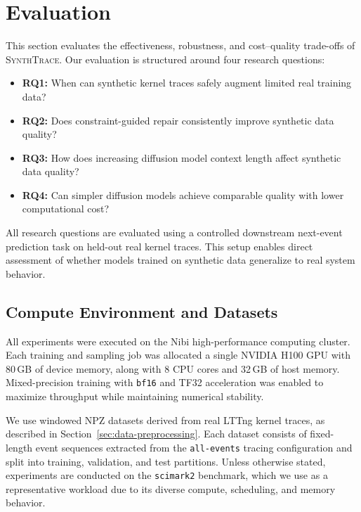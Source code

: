 \section{Evaluation}
\label{sec:evaluation}

This section evaluates the effectiveness, robustness, and cost–quality trade-offs of \textsc{SynthTrace}. Our evaluation is structured around four research questions:

\begin{itemize}[leftmargin=*]
  \item \textbf{RQ1:} When can synthetic kernel traces safely augment limited real training data?
  \item \textbf{RQ2:} Does constraint-guided repair consistently improve synthetic data quality?
  \item \textbf{RQ3:} How does increasing diffusion model context length affect synthetic data quality?
  \item \textbf{RQ4:} Can simpler diffusion models achieve comparable quality with lower computational cost?
\end{itemize}

All research questions are evaluated using a controlled downstream next-event prediction task on held-out real kernel traces. This setup enables direct assessment of whether models trained on synthetic data generalize to real system behavior.

\subsection{Compute Environment and Datasets}

All experiments were executed on the Nibi high-performance computing cluster. Each training and sampling job was allocated a single NVIDIA H100 GPU with 80\,GB of device memory, along with 8 CPU cores and 32\,GB of host memory. Mixed-precision training with \texttt{bf16} and TF32 acceleration was enabled to maximize throughput while maintaining numerical stability.

We use windowed NPZ datasets derived from real LTTng kernel traces, as described in Section~\ref{sec:data-preprocessing}. Each dataset consists of fixed-length event sequences extracted from the \texttt{all-events} tracing configuration and split into training, validation, and test partitions. Unless otherwise stated, experiments are conducted on the \texttt{scimark2} benchmark, which we use as a representative workload due to its diverse compute, scheduling, and memory behavior.

